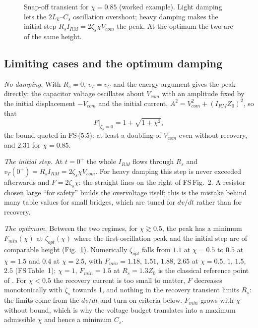 \documentclass[10pt,a4paper]{scrartcl}
\newcommand{\Lk}{L_{k}}
\newcommand{\fs}[1]{\textsf{FS}\,(#1)}
\newcommand{\fstab}[1]{\textsf{FS}\,Table~#1}
\newcommand{\fsfig}[1]{\textsf{FS}\,Fig.~#1}
\begin{document}
\begin{figure}[htb]
\caption{Snap-off transient for $\chi = 0.85$ (worked example). Light damping lets the $2\Lk$--$C_s$ oscillation overshoot; heavy damping makes the initial step $R_sI_{RM} = 2\zeta_s\chi V_{com}$ the peak. At the optimum the two are of the same height.}
\label{fig:snapwave}
\end{figure}

\subsection{Limiting cases and the optimum damping}\label{sec:Fopt}
\emph{No damping.} With $R_s = 0$, $v_T = v_C$ and the energy argument gives the peak directly: the capacitor voltage oscillates about $V_{com}$ with an amplitude fixed by the initial displacement $-V_{com}$ and the initial current, $A^2 = V_{com}^2 + (I_{RM}Z_0)^2$, so that
\begin{equation}
F\big|_{\zeta_s=0} = 1 + \sqrt{1+\chi^2} ,
\label{eq:Fund}
\end{equation}
the bound quoted in \fs{5.5}: at least a doubling of $V_{com}$ even without recovery, and $2.31$ for $\chi = 0.85$.

\emph{The initial step.} At $t = 0^+$ the whole $I_{RM}$ flows through $R_s$ and $v_T(0^+) = R_sI_{RM} = 2\zeta_s\chi V_{com}$. For heavy damping this step is never exceeded afterwards and $F = 2\zeta_s\chi$: the straight lines on the right of \fsfig{2}. A resistor chosen large ``for safety'' builds the overvoltage itself; this is the mistake behind many table values for small bridges, which are tuned for $dv/dt$ rather than for recovery.

\emph{The optimum.} Between the two regimes, for $\chi\gtrsim0.5$, the peak has a minimum $F_{min}(\chi)$ at $\zeta_{opt}(\chi)$ where the first-oscillation peak and the initial step are of comparable height (Fig.~\ref{fig:snapwave}). Numerically $\zeta_{opt}$ falls from $1.1$ at $\chi = 0.5$ to $0.5$ at $\chi = 1.5$ and $0.4$ at $\chi = 2.5$, with $F_{min} = 1.18$, $1.51$, $1.88$, $2.65$ at $\chi = 0.5$, $1$, $1.5$, $2.5$ (\fstab{1}); $\chi = 1$, $F_{min} = 1.5$ at $R_s = 1.3Z_0$ is the classical reference point of \cite{mohan}. For $\chi<0.5$ the recovery current is too small to matter, $F$ decreases monotonically with $\zeta_s$ towards 1, and nothing in the recovery transient limits $R_s$: the limits come from the $dv/dt$ and turn-on criteria below. $F_{min}$ grows with $\chi$ without bound, which is why the voltage budget translates into a maximum admissible $\chi$ and hence a minimum $C_s$.
\end{document}
